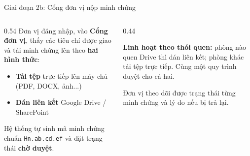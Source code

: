 \documentclass[aspectratio=169, 11pt]{beamer}
\begin{document}
\begin{frame}{Giai đoạn 2b: Cổng đơn vị nộp minh chứng}
\vspace{0.15cm}
\begin{columns}[T]
\begin{column}{0.54\textwidth}\footnotesize
Đơn vị đăng nhập, vào \textbf{Cổng đơn vị}, thấy các tiêu chí được giao và tải minh chứng lên theo \textbf{hai hình thức}:
\begin{itemize}
  \item \textbf{Tải tệp} trực tiếp lên máy chủ (PDF, DOCX, ảnh...)
  \item \textbf{Dán liên kết} Google Drive / SharePoint
\end{itemize}
Hệ thống tự sinh mã minh chứng chuẩn \texttt{Hn.ab.cd.ef} và đặt trạng thái \textbf{chờ duyệt}.
\end{column}
\begin{column}{0.44\textwidth}
\begin{tcolorbox}[enhanced, colback=lightgold, colframe=daugold!80!black, boxrule=0pt, leftrule=3pt, arc=2pt, fontupper=\scriptsize]
\textbf{Linh hoạt theo thói quen:} phòng nào quen Drive thì dán liên kết; phòng khác tải tệp trực tiếp. Cùng một quy trình duyệt cho cả hai.
\end{tcolorbox}
\vspace{0.15cm}
\begin{tcolorbox}[enhanced, colback=lightgreen, colframe=okgreen, boxrule=0pt, leftrule=3pt, arc=2pt, fontupper=\scriptsize]
Đơn vị theo dõi được trạng thái từng minh chứng và lý do nếu bị trả lại.
\end{tcolorbox}
\end{column}
\end{columns}
\end{frame}
\end{document}
